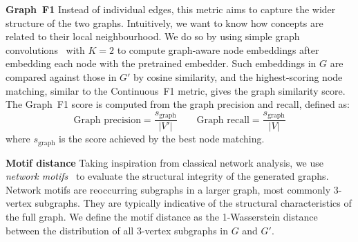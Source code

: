 \documentclass{article}
\begin{document}
\textbf{Graph~F1 }
Instead of individual edges, this metric aims to capture the wider structure of the two graphs. Intuitively, we want to know how concepts are related to their local neighbourhood. We do so by using simple graph convolutions~\cite{wu2019simplifying} with $K=2$ to compute graph-aware node embeddings after embedding each node with the pretrained embedder. Such embeddings in $G$ are compared against those in $G'$ by cosine similarity, and the highest-scoring node matching, similar to the Continuous~F1 metric, gives the graph similarity score. The Graph~F1 score is computed from the graph precision and recall, defined as:
\[
    \text{Graph precision} = \frac{s_\text{graph}}{|V'|} \qquad
    \text{Graph recall} = \frac{s_\text{graph}}{|V|}
\]
where $s_\text{graph}$ is the score achieved by the best node matching.

\textbf{Motif distance }
Taking inspiration from classical network analysis, we use \emph{network motifs}~\cite{milo2002network,shen2002network} to evaluate the structural integrity of the generated graphs. Network motifs are reoccurring subgraphs in a larger graph, most commonly 3-vertex subgraphs. They are typically indicative of the structural characteristics of the full graph. We define the motif distance as the 1-Wasserstein distance~\cite{Kantorovich1960MathematicalMO} between the distribution of all 3-vertex subgraphs in $G$ and $G'$.
\end{document}

